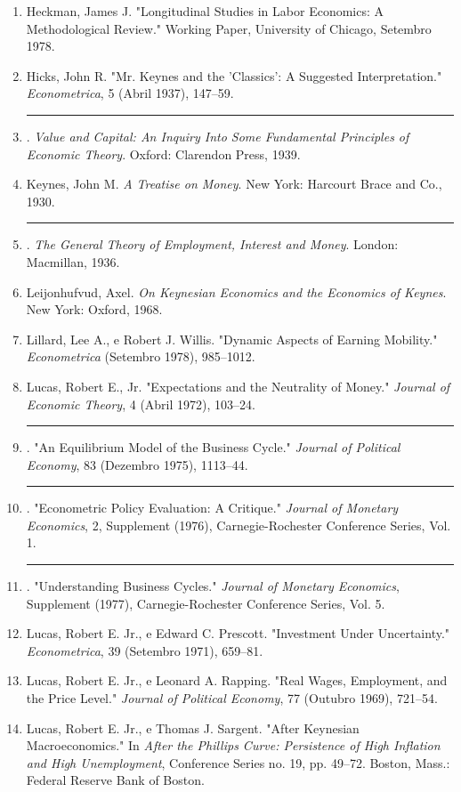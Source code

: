 \documentclass[12pt]{article}
\begin{document}
\begin{enumerate}
    \item Heckman, James J. "Longitudinal Studies in Labor Economics: A Methodological Review." Working Paper, University of Chicago, Setembro 1978.
    \item Hicks, John R. "Mr. Keynes and the 'Classics': A Suggested Interpretation." \textit{Econometrica}, 5 (Abril 1937), 147--59.
    \item \rule{1cm}{0.4pt}. \textit{Value and Capital: An Inquiry Into Some Fundamental Principles of Economic Theory}. Oxford: Clarendon Press, 1939.
    \item Keynes, John M. \textit{A Treatise on Money}. New York: Harcourt Brace and Co., 1930.
    \item \rule{1cm}{0.4pt}. \textit{The General Theory of Employment, Interest and Money}. London: Macmillan, 1936.
    \item Leijonhufvud, Axel. \textit{On Keynesian Economics and the Economics of Keynes}. New York: Oxford, 1968.
    \item Lillard, Lee A., e Robert J. Willis. "Dynamic Aspects of Earning Mobility." \textit{Econometrica} (Setembro 1978), 985--1012.
    \item Lucas, Robert E., Jr. "Expectations and the Neutrality of Money." \textit{Journal of Economic Theory}, 4 (Abril 1972), 103--24.
    \item \rule{1cm}{0.4pt}. "An Equilibrium Model of the Business Cycle." \textit{Journal of Political Economy}, 83 (Dezembro 1975), 1113--44.
    \item \rule{1cm}{0.4pt}. "Econometric Policy Evaluation: A Critique." \textit{Journal of Monetary Economics}, 2, Supplement (1976), Carnegie-Rochester Conference Series, Vol. 1.
    \item \rule{1cm}{0.4pt}. "Understanding Business Cycles." \textit{Journal of Monetary Economics}, Supplement (1977), Carnegie-Rochester Conference Series, Vol. 5.
    \item Lucas, Robert E. Jr., e Edward C. Prescott. "Investment Under Uncertainty." \textit{Econometrica}, 39 (Setembro 1971), 659--81.
    \item Lucas, Robert E. Jr., e Leonard A. Rapping. "Real Wages, Employment, and the Price Level." \textit{Journal of Political Economy}, 77 (Outubro 1969), 721--54.
    \item Lucas, Robert E. Jr., e Thomas J. Sargent. "After Keynesian Macroeconomics." In \textit{After the Phillips Curve: Persistence of High Inflation and High Unemployment}, Conference Series no. 19, pp. 49--72. Boston, Mass.: Federal Reserve Bank of Boston.

\end{enumerate}
\end{document}
